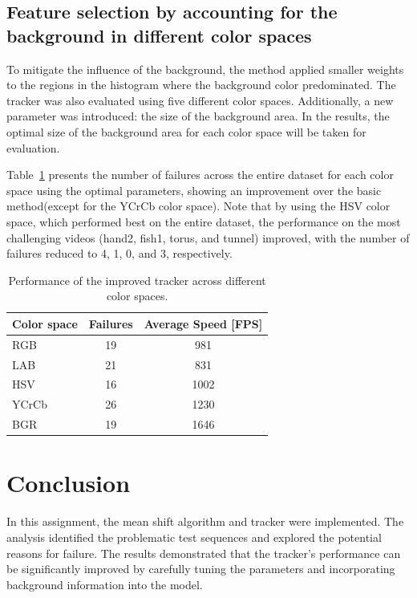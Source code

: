 \documentclass[9pt]{IEEEtran}
\begin{document}
\subsection{Feature selection by accounting for the background in different color spaces}
To mitigate the influence of the background, the method applied smaller weights to the regions in the histogram where
 the background color predominated. The tracker was also evaluated using five different color spaces. Additionally,
  a new parameter was introduced: the size of the background area. In the results, the optimal size of the background area 
  for each color space will be taken for evaluation.

Table~\ref{tab:color_spaces_results} presents the number of failures across the entire dataset for each color 
space using the optimal parameters, showing an improvement over the basic 
method(except for the YCrCb color space). Note that by using the HSV color 
space, which performed best on the entire dataset,
 the performance
 on the most challenging videos (hand2, fish1, torus, and tunnel) improved, with the number of failures
  reduced to 4, 1, 0, and 3, respectively. 

   \begin{table}[h]
    \centering
    \caption{Performance of the improved tracker across different color spaces.}
    \begin{tabular}{lcc}
    \hline
    \textbf{Color space} & \textbf{Failures} & \textbf{Average Speed [FPS]} \\ 
    \hline
    RGB                 & 19                & 981                  \\ 
    LAB                 & 21                & 831                  \\ 
    HSV                 & 16                & 1002                 \\ 
    YCrCb               & 26                & 1230                 \\ 
    BGR                 & 19                & 1646                 \\ 
    \hline
    \end{tabular}

    \label{tab:color_spaces_results}
    \end{table}
    

\section{Conclusion}
In this assignment, the mean shift algorithm and tracker were implemented.
 The analysis identified the problematic test sequences and explored the potential reasons for failure.
  The results demonstrated that the tracker’s performance can be significantly improved by carefully tuning the 
  parameters and incorporating background information into the model.


\end{document}
